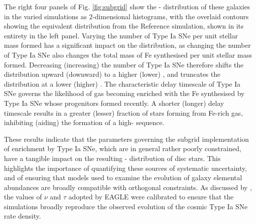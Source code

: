 The right four panels of Fig. \ref{fig:subgrid} show the \afe{}-\feh{} distribution of these galaxies in the varied simulations as 2-dimensional histograms, with the overlaid contours showing the equivalent distribution from the Reference simulation, shown in its entirety in the left panel. Varying the number of Type Ia SNe per unit stellar mass formed has a significant impact on the distribution, as changing the number of Type Ia SNe also changes the total mass of Fe synthesised per unit stellar mass formed. Decreasing (increasing) the number of Type Ia SNe therefore shifts the distribution upward (downward) to a higher (lower) \afe{}, and truncates the distribution at a lower (higher) \feh{}. The characteristic delay timescale of Type Ia SNe governs the likelihood of gas becoming enriched with the Fe synthesised by Type Ia SNe whose progenitors formed recently. A shorter (longer) delay timescale results in a greater (lesser) fraction of stars forming from Fe-rich gas, inhibiting (aiding) the formation of a high-\afe{} sequence. 

These results indicate that the parameters governing the subgrid implementation of enrichment by Type Ia SNe, which are in general rather poorly constrained, have a tangible impact on the resulting \afe{}-\feh{} distribution of disc stars. This highlights the importance of quantifying these sources of systematic uncertainty, and of ensuring that models used to examine the evolution of galaxy elemental abundances are broadly compatible with orthogonal constraints. As discussed by \citet{2015MNRAS.446..521S}, the values of $\nu$ and $\tau$ adopted by EAGLE were calibrated to ensure that the simulations broadly reproduce the observed evolution of the cosmic Type Ia SNe rate density. 

